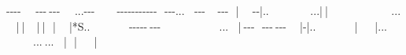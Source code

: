 -{}-{}-{}-{}{\mbox{$~$}}{\mbox{$~$}}{\mbox{$~$}}{\mbox{$~$}}{\mbox{$~$}}{\mbox{$~$}}-{}-{}-{}{\mbox{$~$}}-{}-{}-{}{\mbox{$~$}}{\mbox{$~$}}{\mbox{$~$}}{\mbox{$~$}}{\mbox{$~$}}{\mbox{$~$}}...-{}-{}-{}{\mbox{$~$}}{\mbox{$~$}}{\mbox{$~$}}{\mbox{$~$}}{\mbox{$~$}}{\mbox{$~$}}{\mbox{$~$}}{\mbox{$~$}}{\mbox{$~$}}-{}-{}-{}-{}-{}-{}-{}-{}-{}-{}-{}{\mbox{$~$}}{\mbox{$~$}}{\mbox{$~$}}-{}-{}-{}...{\mbox{$~$}}{\mbox{$~$}}{\mbox{$~$}}{\mbox{$~$}}-{}-{}-{}{\mbox{$~$}}{\mbox{$~$}}{\mbox{$~$}}{\mbox{$~$}}{\mbox{$~$}}-{}-{}-{}{\mbox{$~$}}{\mbox{$~$}}{\mbox{$~$}}\allowbreak{}|$\text{ }$\newline{}
{\mbox{$~$}}-{}-{}\allowbreak{}|..{\mbox{$~$}}{\mbox{$~$}}{\mbox{$~$}}{\mbox{$~$}}{\mbox{$~$}}{\mbox{$~$}}{\mbox{$~$}}{\mbox{$~$}}{\mbox{$~$}}{\mbox{$~$}}{\mbox{$~$}}{\mbox{$~$}}{\mbox{$~$}}{\mbox{$~$}}{\mbox{$~$}}{\mbox{$~$}}{\mbox{$~$}}...\allowbreak{}|{\mbox{$~$}}\allowbreak{}|{\mbox{$~$}}{\mbox{$~$}}{\mbox{$~$}}{\mbox{$~$}}{\mbox{$~$}}{\mbox{$~$}}{\mbox{$~$}}{\mbox{$~$}}{\mbox{$~$}}{\mbox{$~$}}{\mbox{$~$}}{\mbox{$~$}}{\mbox{$~$}}{\mbox{$~$}}{\mbox{$~$}}{\mbox{$~$}}{\mbox{$~$}}{\mbox{$~$}}{\mbox{$~$}}{\mbox{$~$}}{\mbox{$~$}}{\mbox{$~$}}{\mbox{$~$}}{\mbox{$~$}}{\mbox{$~$}}{\mbox{$~$}}...{\mbox{$~$}}{\mbox{$~$}}{\mbox{$~$}}{\mbox{$~$}}\allowbreak{}|{\mbox{$~$}}\allowbreak{}|{\mbox{$~$}}{\mbox{$~$}}{\mbox{$~$}}{\mbox{$~$}}{\mbox{$~$}}\allowbreak{}|{\mbox{$~$}}\allowbreak{}|{\mbox{$~$}}{\mbox{$~$}}{\mbox{$~$}}\allowbreak{}|$\text{ }$\newline{}
{\mbox{$~$}}\allowbreak{}|*S\footnotemark[119]..{\mbox{$~$}}{\mbox{$~$}}{\mbox{$~$}}{\mbox{$~$}}{\mbox{$~$}}{\mbox{$~$}}{\mbox{$~$}}{\mbox{$~$}}{\mbox{$~$}}{\mbox{$~$}}{\mbox{$~$}}{\mbox{$~$}}{\mbox{$~$}}{\mbox{$~$}}{\mbox{$~$}}{\mbox{$~$}}-{}-{}-{}-{}-{}{\mbox{$~$}}-{}-{}-{}{\mbox{$~$}}{\mbox{$~$}}{\mbox{$~$}}{\mbox{$~$}}{\mbox{$~$}}{\mbox{$~$}}{\mbox{$~$}}{\mbox{$~$}}{\mbox{$~$}}{\mbox{$~$}}{\mbox{$~$}}{\mbox{$~$}}{\mbox{$~$}}{\mbox{$~$}}{\mbox{$~$}}{\mbox{$~$}}{\mbox{$~$}}{\mbox{$~$}}{\mbox{$~$}}{\mbox{$~$}}{\mbox{$~$}}{\mbox{$~$}}{\mbox{$~$}}{\mbox{$~$}}...{\mbox{$~$}}{\mbox{$~$}}{\mbox{$~$}}{\mbox{$~$}}\allowbreak{}|{\mbox{$~$}}-{}-{}-{}{\mbox{$~$}}{\mbox{$~$}}{\mbox{$~$}}-{}-{}-{}{\mbox{$~$}}-{}-{}-{}$\text{ }$\newline{}
{\mbox{$~$}}\allowbreak{}|-{}\allowbreak{}|..{\mbox{$~$}}{\mbox{$~$}}{\mbox{$~$}}{\mbox{$~$}}{\mbox{$~$}}{\mbox{$~$}}{\mbox{$~$}}{\mbox{$~$}}{\mbox{$~$}}{\mbox{$~$}}{\mbox{$~$}}{\mbox{$~$}}{\mbox{$~$}}{\mbox{$~$}}{\mbox{$~$}}{\mbox{$~$}}\allowbreak{}|{\mbox{$~$}}{\mbox{$~$}}{\mbox{$~$}}{\mbox{$~$}}{\mbox{$~$}}{\mbox{$~$}}{\mbox{$~$}}\allowbreak{}|...{\mbox{$~$}}{\mbox{$~$}}{\mbox{$~$}}{\mbox{$~$}}{\mbox{$~$}}{\mbox{$~$}}{\mbox{$~$}}{\mbox{$~$}}{\mbox{$~$}}{\mbox{$~$}}{\mbox{$~$}}{\mbox{$~$}}{\mbox{$~$}}{\mbox{$~$}}{\mbox{$~$}}{\mbox{$~$}}{\mbox{$~$}}...{\mbox{$~$}}...{\mbox{$~$}}{\mbox{$~$}}{\mbox{$~$}}{\mbox{$~$}}\allowbreak{}|{\mbox{$~$}}{\mbox{$~$}}{\mbox{$~$}}\allowbreak{}|{\mbox{$~$}}{\mbox{$~$}}{\mbox{$~$}}{\mbox{$~$}}{\mbox{$~$}}{\mbox{$~$}}{\mbox{$~$}}\allowbreak{}|{\mbox{$~$}}{\mbox{$~$}}$\text{ }$\newline{}
